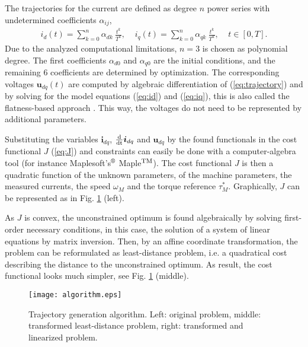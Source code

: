 \documentclass[a4paper,11pt,fleqn]{article}
\newcommand{\ddt}{\frac{\textnormal{d}}{\textnormal{dt}}}
\begin{document}
The trajectories for the current are defined as degree $n$ power series with undetermined coefficients $\alpha_{ij}$,
\begin{align}
i_{d}(t) = \sum_{k=0}^{n} \alpha_{dk} \ \frac{t^{k}}{T^k} ,  \;\;\;\;  i_{q}(t) = \sum_{k=0}^{n} \alpha_{qk} \ \frac{t^{k}}{T^k} , \;\;\;\; t\in[0,T]  .  \label{eq:trajectory}
\end{align}
Due to the analyzed computational limitations, $n=3$ is chosen as polynomial degree. The first coefficients $\alpha_{d0}$ and $\alpha_{q0}$ are the initial conditions, and the remaining $6$ coefficients are determined by optimization. The corresponding voltages $\bm{u}_{dq}(t)$ are computed by algebraic differentiation of (\ref{eq:trajectory}) and by solving for the model equations (\ref{eq:id}) and (\ref{eq:iq}), this is also called the flatness-based approach \cite{HSR04}. This way, the voltages do not need to be represented by additional parameters.

Substituting the variables $\bm{i}_{dq}$, $\ddt \bm{i}_{dq}$ and $\bm{u}_{dq}$ by the found functionals in the cost functional $J$ (\ref{eq:J}) and constraints can easily be done with a computer-algebra tool (for instance Maplesoft's$^\text{\textregistered}$ Maple$^{\textnormal{TM}}$). The cost functional $J$ is then a quadratic function of the unknown parameters, of the machine parameters, the measured currents, the speed $\omega_M$ and the torque reference $\tau_M^*$. Graphically, $J$ can be represented as in Fig. \ref{fig:algorithm} (left).


As $J$ is convex, the unconstrained optimum is found algebraically by solving first-order necessary conditions, in this case, the solution of a system of linear equations by matrix inversion. Then, by an affine coordinate transformation, the problem can be reformulated as least-distance problem, i.e. a quadratical cost describing the distance to the unconstrained optimum. As result, the cost functional looks much simpler, see Fig. \ref{fig:algorithm} (middle).




\begin{figure}[!htb]
  \centering
  \texttt{[image: algorithm.eps]}
  \caption{Trajectory generation algorithm. Left: original problem, middle: transformed least-distance problem, right: transformed and linearized problem.\label{fig:algorithm}}
\end{figure}
\end{document}
